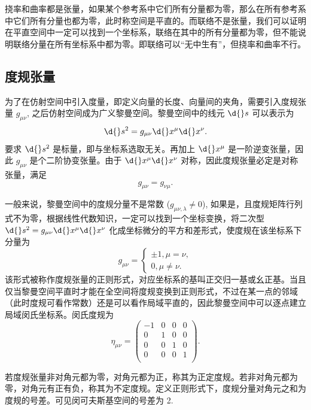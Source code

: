 \documentclass[UTF8, 12pt, a4paper, oneside, onecolumn, fontset=none]{ctexart}
\begin{document}
挠率和曲率都是张量，如果某个参考系中它们所有分量都为零，那么在所有参考系中它们所有分量也都为零，此时称空间是平直的。而联络不是张量，我们可以证明在平直空间中一定可以找到一个坐标系，联络在其中的所有分量都为零，但不能说明联络分量在所有坐标系中都为零。即联络可以“无中生有”，但挠率和曲率不行。

\subsection{度规张量}
为了在仿射空间中引入度量，即定义向量的长度、向量间的夹角，需要引入度规张量 $g_{\mu\nu}$, 之后仿射空间成为广义黎曼空间。黎曼空间中的线元 $\d{}s$ 可以表示为
\begin{equation}
\d{}s^{2}=g_{\mu\nu}\d{}x^{\mu}\d{}x^{\nu}.
\end{equation}
要求 $\d{}s^{2}$ 是标量，即与坐标系选取无关。再加上 $\d{}x^{\mu}$ 是一阶逆变张量，因此 $g_{\mu\nu}$ 是个二阶协变张量。由于 $\d{}x^{\mu}\d{}x^{\nu}$ 对称，因此度规张量必定是对称张量，满足
\begin{equation}
g_{\mu\nu}=g_{\nu\mu}.
\end{equation}

一般来说，黎曼空间中的度规分量不是常数 ($g_{\mu\nu,\lambda}\ne0$), 如果是，且度规矩阵行列式不为零，根据线性代数知识，一定可以找到一个坐标变换，将二次型 $\d{}s^{2}=g_{\mu\nu}\d{}x^{\mu}\d{}x^{\nu}$ 化成坐标微分的平方和差形式，使度规在该坐标系下分量为
\begin{equation}
g_{\mu\nu}=
\begin{cases}
\pm1,\mu=\nu,\\
0,\mu\ne\nu.
\end{cases}
\end{equation}
该形式被称作度规张量的正则形式，对应坐标系的基叫正交归一基或幺正基。当且仅当黎曼空间平直时才能在全空间将度规变换到正则形式，不过在某一点的邻域（此时度规可看作常数）还是可以看作局域平直的，因此黎曼空间中可以逐点建立局域闵氏坐标系。闵氏度规为
\begin{equation}
\eta_{\mu\nu}=
\begin{pmatrix}
-1 & 0 & 0 & 0\\
0 & 1 & 0 & 0\\
0 & 0 & 1 & 0\\
0 & 0 & 0 & 1\\
\end{pmatrix}.
\end{equation}

若度规张量非对角元都为零，对角元都为正，称其为正定度规。若非对角元都为零，对角元有正有负，称其为不定度规。定义正则形式下，度规分量对角元之和为度规的号差。可见闵可夫斯基空间的号差为 2.
\end{document}
